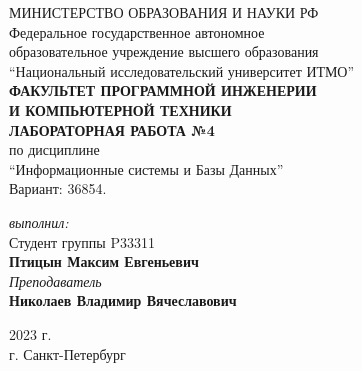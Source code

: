 
\begin{center}
	МИНИСТЕРСТВО ОБРАЗОВАНИЯ И НАУКИ РФ\\
	\hfill \break
	Федеральное государственное автономное\\
	образовательное учреждение высшего образования\\
	``Национальный исследовательский университет ИТМО''\\
	\hfill \break
	\textbf{ФАКУЛЬТЕТ ПРОГРАММНОЙ ИНЖЕНЕРИИ \\
	И КОМПЬЮТЕРНОЙ ТЕХНИКИ}\\
	\vspace{2cm}
	\large{\textbf{ЛАБОРАТОРНАЯ РАБОТА №4}}\\
	\hfill \break
	по дисциплине\\
		\large{``Информационные системы и Базы Данных''}\\
	\hfill \break
	Вариант: 36854. \\
\end{center}
\begin{flushright}
	\vspace{3cm}
	\textit{выполнил:}\\
	Студент группы P33311\\
	\textbf{Птицын Максим Евгеньевич}\\
	\textit{Преподаватель}\\
	\textbf{Николаев Владимир Вячеславович}
\end{flushright}
\vspace{5cm}
\begin{center}
	2023 г.\\
	г. Санкт-Петербург
\end{center}
\thispagestyle{empty}
\newpage